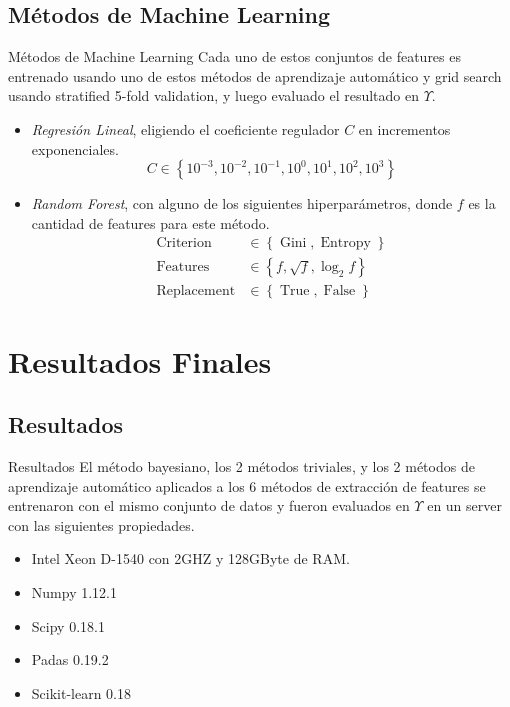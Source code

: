 \documentclass[usenames,dvipsnames,table]{beamer}
\begin{document}
\subsection{Métodos de Machine Learning}
\begin{frame}{Métodos de Machine Learning}
	Cada uno de estos conjuntos de features es entrenado usando uno de estos métodos de aprendizaje automático y grid search usando stratified 5-fold validation, y luego evaluado el resultado en $\Upsilon$.
	\begin{itemize}
		\item \emph{Regresión Lineal}, eligiendo el coeficiente regulador $C$ en incrementos exponenciales.
			\begin{equation*}
				C \in \left\{ 10^{-3}, 10^{-2}, 10^{-1}, 10^0, 10^1, 10^2, 10^3 \right\}
			\end{equation*}
		\item \emph{Random Forest}, con alguno de los siguientes hiperparámetros, donde $f$ es la cantidad de features para este método.
			\begin{align*}
				\operatorname{Criterion} &\in \left\{ \operatorname{Gini}, \operatorname{Entropy} \right\} \\
				\operatorname{Features} &\in \left\{ f, \sqrt{f}, \log_2{f} \right\} \\
				\operatorname{Replacement} &\in \left\{ \operatorname{True}, \operatorname{False} \right\}
			\end{align*}
	\end{itemize}
\end{frame}

\section{Resultados Finales}

\subsection{Resultados}
\begin{frame}{Resultados}
	El método bayesiano, los 2 métodos triviales, y los 2 métodos de aprendizaje automático aplicados a los 6 métodos de extracción de features se entrenaron con el mismo conjunto de datos y fueron evaluados en $\Upsilon$ en un server con las siguientes propiedades.

	\begin{itemize}
		\item Intel Xeon D-1540 con 2GHZ y 128GByte de RAM.\@  \\
		\item Numpy 1.12.1 \\
		\item Scipy 0.18.1 \\
		\item Padas 0.19.2 \\
		\item Scikit-learn 0.18
	\end{itemize}
\end{frame}
\end{document}
